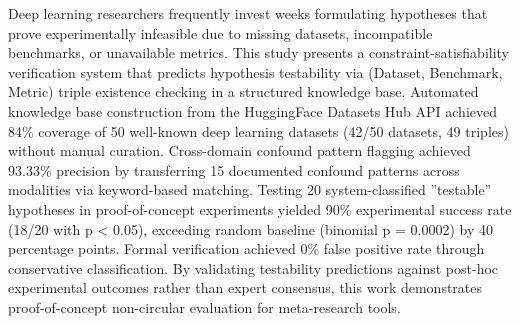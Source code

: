 
Deep learning researchers frequently invest weeks formulating hypotheses that prove experimentally infeasible due to missing datasets, incompatible benchmarks, or unavailable metrics. This study presents a constraint-satisfiability verification system that predicts hypothesis testability via (Dataset, Benchmark, Metric) triple existence checking in a structured knowledge base. Automated knowledge base construction from the HuggingFace Datasets Hub API achieved 84\% coverage of 50 well-known deep learning datasets (42/50 datasets, 49 triples) without manual curation. Cross-domain confound pattern flagging achieved 93.33\% precision by transferring 15 documented confound patterns across modalities via keyword-based matching. Testing 20 system-classified ''testable'' hypotheses in proof-of-concept experiments yielded 90\% experimental success rate (18/20 with p < 0.05), exceeding random baseline (binomial p = 0.0002) by 40 percentage points. Formal verification achieved 0\% false positive rate through conservative classification. By validating testability predictions against post-hoc experimental outcomes rather than expert consensus, this work demonstrates proof-of-concept non-circular evaluation for meta-research tools.
